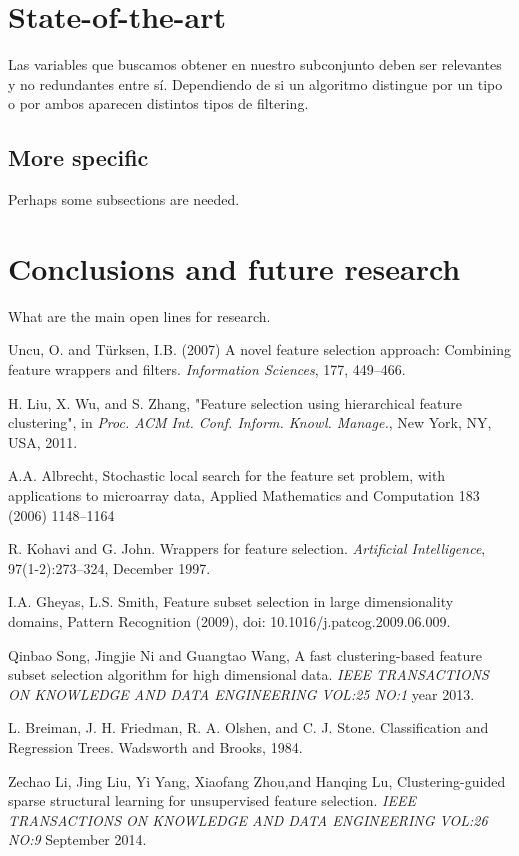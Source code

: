 \documentclass[a4paper,11pt]{article}
\begin{document}
\section{State-of-the-art}

Las variables que buscamos obtener en nuestro subconjunto deben ser relevantes y no redundantes entre sí. Dependiendo de si un algoritmo distingue por un tipo o por ambos aparecen distintos tipos de filtering.

    \subsection{More specific}


Perhaps some subsections are needed.

\section{Conclusions and future research}

What are the main open lines for research.




\begin{thebibliography}{}

Uncu, O. and T\"urksen, I.B. (2007) A novel feature selection
approach: Combining feature wrappers and filters. \textit{Information Sciences}, 177, 449--466.

H. Liu, X. Wu, and S. Zhang, "Feature selection using hierarchical feature clustering", in \textit{Proc. ACM Int. Conf. Inform. Knowl. Manage.}, New York, NY, USA, 2011.

A.A. Albrecht, Stochastic local search for the feature set problem, with applications to microarray data, Applied Mathematics and Computation 183 (2006) 1148–1164

R. Kohavi and G. John. Wrappers for feature selection. \textit{Artificial Intelligence}, 97(1-2):273–324,
December 1997.

I.A. Gheyas, L.S. Smith, Feature subset selection in large dimensionality domains, Pattern Recognition (2009), doi:
10.1016/j.patcog.2009.06.009.

Qinbao Song, Jingjie Ni and Guangtao Wang, A fast clustering-based feature subset selection algorithm for high dimensional data. \textit{IEEE TRANSACTIONS ON KNOWLEDGE AND DATA ENGINEERING VOL:25 NO:1} year 2013.

L. Breiman, J. H. Friedman, R. A. Olshen, and C. J. Stone. Classification and Regression Trees. Wadsworth and Brooks, 1984.

Zechao Li, Jing Liu, Yi Yang, Xiaofang Zhou,and Hanqing Lu, Clustering-guided sparse structural learning
for unsupervised feature selection. \textit{IEEE TRANSACTIONS ON KNOWLEDGE AND DATA ENGINEERING VOL:26 NO:9} September 2014.

\end{thebibliography}
\end{document}
